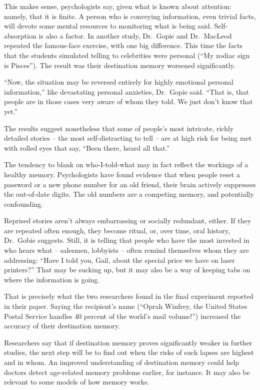 ﻿\documentclass[12pt]{article}
\begin{document}
This makes sense, psychologists say, given what is known about attention: namely, that it is finite.
A person who is conveying information, even trivial facts, will devote some mental resources to
monitoring what is being said. Self-absorption is also a factor. In another study, Dr.~Gopie and
Dr.~MacLeod repeated the famous-face exercise, with one big difference. This time the facts that the
students simulated telling to celebrities were personal (``My zodiac sign is Pisces''). The result
was their destination memory worsened significantly.

``Now, the situation may be reversed entirely for highly emotional personal information,'' like
devastating personal anxieties, Dr.~Gopie said. ``That is, that people are in those cases very aware
of whom they told. We just don't know that yet.''

The results suggest nonetheless that some of people's most intricate, richly detailed stories -- the
most self-distracting to tell -- are at high risk for being met with rolled eyes that say, ``Been
there, heard all that.''

The tendency to blank on who-I-told-what may in fact reflect the workings of a healthy memory.
Psychologists have found evidence that when people reset a password or a new phone number for an old
friend, their brain actively suppresses the out-of-date digits. The old numbers are a competing
memory, and potentially confounding.

Reprised stories aren't always embarrassing or socially redundant, either. If they are repeated
often enough, they become ritual, or, over time, oral history, Dr.~Gobie suggests. Still, it is
telling that people who have the most invested in who hears what -- salesmen, lobbyists -- often
remind themselves whom they are addressing: ``Have I told you, Gail, about the special price we have
on laser printers?'' That may be sucking up, but it may also be a way of keeping tabs on where the
information is going.

That is precisely what the two researchers found in the final experiment reported in their paper.
Saying the recipient's name (``Oprah Winfrey, the United States Postal Service handles 40 percent of
the world's mail volume!'') increased the accuracy of their destination memory.

Researchers say that if destination memory proves significantly weaker in further studies, the next
step will be to find out when the risks of such lapses are highest and in whom. An improved
understanding of destination memory could help doctors detect age-related memory problems earlier,
for instance. It may also be relevant to some models of how memory works.
\end{document}
